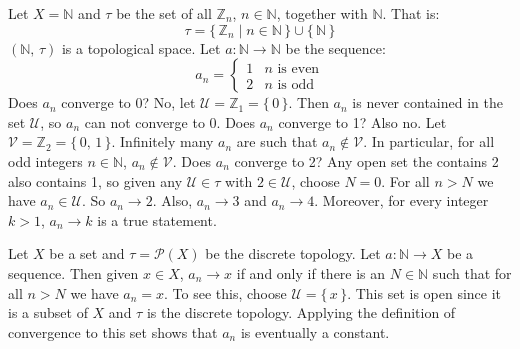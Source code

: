 \documentclass{article}
\theoremstyle{plain}
\theoremstyle{normal}
\newenvironment{example}{%
    \pushQED{\qed}\renewcommand{\qedsymbol}{$\blacksquare$}\examplex%
}{%
    \popQED\endexamplex%
}
\begin{document}
        \begin{example}
            Let $X=\mathbb{N}$ and $\tau$ be the set of all $\mathbb{Z}_{n}$,
            $n\in\mathbb{N}$, together with $\mathbb{N}$. That is:
            \begin{equation}
                \tau=\{\,\mathbb{Z}_{n}\;|\;n\in\mathbb{N}\,\}
                    \cup\{\,\mathbb{N}\,\}
            \end{equation}
            $(\mathbb{N},\,\tau)$ is a topological space.
            Let $a:\mathbb{N}\rightarrow\mathbb{N}$ be the sequence:
            \begin{equation}
                a_{n}=
                \begin{cases}
                    1&n\textrm{ is even}\\
                    2&n\textrm{ is odd}
                \end{cases}
            \end{equation}
            Does $a_{n}$ converge to 0? No, let
            $\mathcal{U}=\mathbb{Z}_{1}=\{\,0\,\}$. Then $a_{n}$ is never
            contained in the set $\mathcal{U}$, so $a_{n}$ can not converge
            to 0. Does $a_{n}$ converge to 1? Also no. Let
            $\mathcal{V}=\mathbb{Z}_{2}=\{\,0,\,1\,\}$. Infinitely many
            $a_{n}$ are such that $a_{n}\notin\mathcal{V}$. In particular, for
            all odd integers $n\in\mathbb{N}$, $a_{n}\notin\mathcal{V}$. Does
            $a_{n}$ converge to 2? Any open set the contains 2 also contains 1,
            so given any $\mathcal{U}\in\tau$ with $2\in\mathcal{U}$, choose
            $N=0$. For all $n>N$ we have $a_{n}\in\mathcal{U}$. So
            $a_{n}\rightarrow{2}$. Also, $a_{n}\rightarrow{3}$ and
            $a_{n}\rightarrow{4}$. Moreover, for every integer
            $k>1$, $a_{n}\rightarrow{k}$ is a true statement.
        \end{example}
        \begin{example}
            Let $X$ be a set and $\tau=\mathcal{P}(X)$ be the discrete topology.
            Let $a:\mathbb{N}\rightarrow{X}$ be a sequence. Then given
            $x\in{X}$, $a_{n}\rightarrow{x}$ if and only if there is an
            $N\in\mathbb{N}$ such that for all $n>N$ we have
            $a_{n}=x$. To see this, choose $\mathcal{U}=\{\,x\,\}$. This set
            is open since it is a subset of $X$ and $\tau$ is the discrete
            topology. Applying the definition of convergence to this set
            shows that $a_{n}$ is eventually a constant.
        \end{example}
\end{document}
